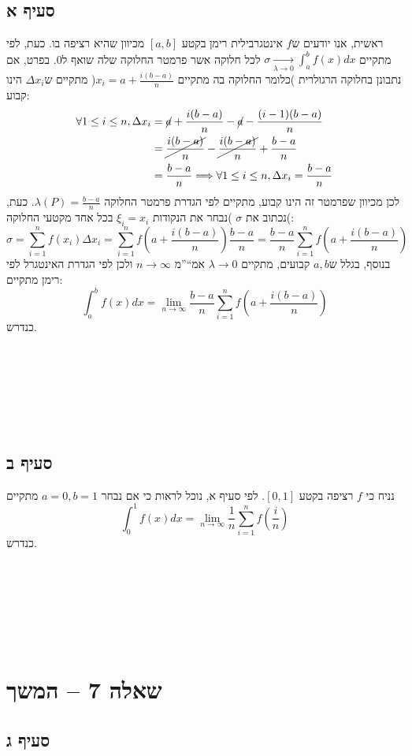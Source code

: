 \documentclass[11pt, oneside]{article}
\newcommand{\qed}{\R{$\blacksquare$}}
\newcommand{\br}{\\\\\\\\\\\\\\}
\newcommand{\opr}[1]{\xrightarrow[\text{#1}]{}}
\newcommand{\logr}[1]{\underset{\text{#1}}{\Longrightarrow}}
\newcommand{\h}[3]{\R{הגדרה #3#2.#1}}
\newcommand{\defi}[3]{\int_{#1}^{#2} #3}
\begin{document}
\subsection*{סעיף א}
ראשית, אנו יודעים ש$f$ אינטגרבילית רימן בקטע $[a, b]$ מכיוון שהיא רציפה בו. כעת, לפי \h{1}{53}{} מתקיים $\sigma \opr{$\lambda \to 0$} \defi{a}{b}{f(x)dx}$ לכל חלוקה אשר פרמטר החלוקה שלה שואף ל0. בפרט, אם נתבונן בחלוקה הרגולרית )כלומר החלוקה בה מתקיים $x_{i} = a + \frac{i(b - a)}{n}$( מתקיים ש$\Delta x_{i}$ הינו קבוע:
\begin{align*}
\forall 1 \le i \le n, \Delta x_{i} &= \cancel{a} + \frac{i(b - a)}{n} - \cancel{a} - \frac{(i - 1)(b - a)}{n}\\
&= \cancel{\frac{i(b - a)}{n}} - \cancel{\frac{i(b - a)}{n}} + \frac{b - a}{n}\\
&= \frac{b - a}{n} \logr{} \forall 1 \le i \le n, \Delta x_{i} = \frac{b - a}{n}
\end{align*}
לכן מכיוון שפרמטר זה הינו קבוע, מתקיים לפי הגדרת פרמטר החלוקה $\lambda(P) = \frac{b - a}{n}$. כעת, נכתוב את $\sigma$ )נבחר את הנקודות $\xi_{i} = x_{i}$ בכל אחד מקטעי החלוקה(:
\[
\sigma = \sum^{n}_{i = 1} f(x_{i}) \Delta x_{i} = \sum^{n}_{i = 1} f\left(a + \frac{i(b - a)}{n}\right) \frac{b - a}{n} = \frac{b - a}{n} \sum^{n}_{i = 1} f\left(a + \frac{i(b - a)}{n}\right)
\]
בנוסף, בגלל ש$a, b$ קבועים, מתקיים $\lambda \to 0$ אמ``''מ $n \to \infty$ ולכן לפי הגדרת האינטגרל לפי רימן מתקיים:
\[
\defi{a}{b}{f(x)dx} = \lim_{n \to \infty} \frac{b - a}{n} \sum^{n}_{i = 1} f\left(a + \frac{i(b - a)}{n}\right)
\]
כנדרש.
\br\qed

\subsection*{סעיף ב}
נניח כי $f$ רציפה בקטע $[0, 1]$. לפי סעיף א, נוכל לראות כי אם נבחר $a = 0, b = 1$ מתקיים
\[
\defi{0}{1}{f(x)dx} = \lim_{n \to \infty} \frac{1}{n} \sum^{n}_{i = 1} f\left(\frac{i}{n}\right)
\]
כנדרש.
\br\qed
\clearpage

\section*{שאלה 7 -- המשך}
\subsection*{סעיף ג}
\end{document}
